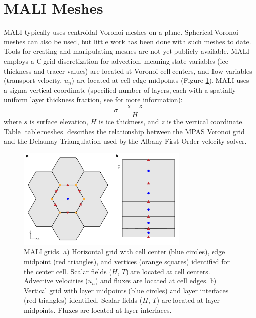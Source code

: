 \section{MALI Meshes}

MALI typically uses centroidal Voronoi meshes on a plane.  
Spherical Voronoi meshes can also be used, but little work has been done with such meshes to date. 
Tools for creating and manipulating meshes are not yet publicly available.
MALI employs a C-grid discretization \citep{Arakawa1977} for advection, meaning state variables (ice thickness and tracer values) are located at Voronoi cell centers,
and flow variables (transport velocity, $u_n$) are located at cell edge midpoints (Figure \ref{fig:cellDiagram}).
MALI uses a sigma vertical coordinate (specified number of layers, each with a spatially uniform layer thickness fraction, see \citep{Petersen2015} for more information):
\begin{equation}
\sigma = \frac{s-z}{H}
\label{eq:sigma}
\end{equation}
where $s$ is surface elevation, $H$ is ice thickness, and $z$ is the vertical coordinate. 
Table \ref{table:meshes} describes the relationship between the MPAS Voronoi grid and the Delaunay Triangulation used by the Albany First Order velocity solver.

\begin{figure}[h]
\centering
\includegraphics[width=8.3cm]{landice/figures/mpas_grids.pdf}
\caption{MALI grids.  
a) Horizontal grid with cell center (blue circles), edge midpoint (red triangles), and vertices (orange squares) identified for the center cell. Scalar fields ($H$, $T$) are located at cell centers.  Advective velocities ($u_n$) and fluxes are located at cell edges.
b) Vertical grid with layer midpoints (blue circles) and layer interfaces (red triangles) identified.  
Scalar fields ($H$, $T$) are located at layer midpoints.  Fluxes are located at layer interfaces.
}
\label{fig:cellDiagram}
\end{figure}


